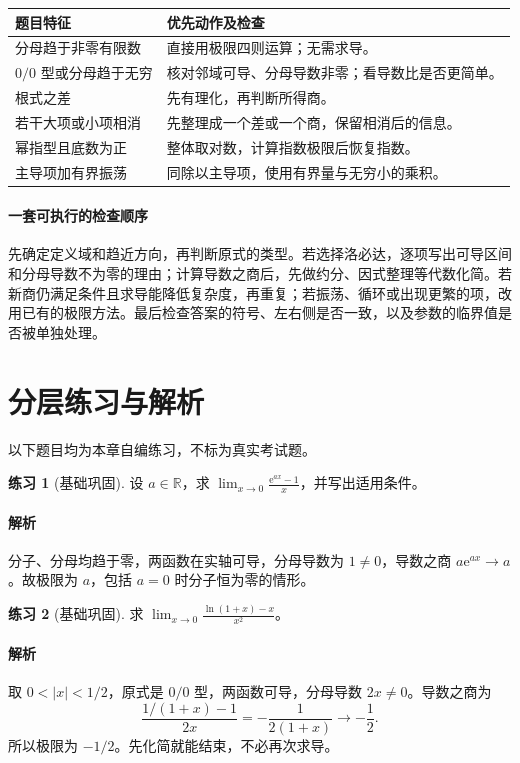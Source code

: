\documentclass[UTF8,fontset=fandol,12pt,oneside,openany]{ctexrep}
\newcommand{\R}{\mathbb R}
\newcommand{\ee}{\mathrm e}
\theoremstyle{definition}
\newtheorem{exercise}{练习}[chapter]
\begin{document}
\begin{center}
\begin{tabular}{p{}p{}}
\toprule
题目特征 & 优先动作及检查 \\
\midrule
分母趋于非零有限数 & 直接用极限四则运算；无需求导。 \\
$0/0$ 型或分母趋于无穷 & 核对邻域可导、分母导数非零；看导数比是否更简单。 \\
根式之差 & 先有理化，再判断所得商。 \\
若干大项或小项相消 & 先整理成一个差或一个商，保留相消后的信息。 \\
幂指型且底数为正 & 整体取对数，计算指数极限后恢复指数。 \\
主导项加有界振荡 & 同除以主导项，使用有界量与无穷小的乘积。 \\
\bottomrule
\end{tabular}
\end{center}

\paragraph{一套可执行的检查顺序}
先确定定义域和趋近方向，再判断原式的类型。若选择洛必达，逐项写出可导区间和分母导数不为零的理由；计算导数之商后，先做约分、因式整理等代数化简。若新商仍满足条件且求导能降低复杂度，再重复；若振荡、循环或出现更繁的项，改用已有的极限方法。最后检查答案的符号、左右侧是否一致，以及参数的临界值是否被单独处理。

\section{分层练习与解析}
\label{lec:07:exercises}

以下题目均为本章自编练习，不标为真实考试题。

\begin{exercise}[基础巩固]
设 $a\in\R$，求 $\displaystyle\lim_{x\to0}\frac{\ee^{ax}-1}{x}$，并写出适用条件。
\end{exercise}
\paragraph{解析}
分子、分母均趋于零，两函数在实轴可导，分母导数为 $1\ne0$，导数之商 $a\ee^{ax}\to a$。故极限为 $a$，包括 $a=0$ 时分子恒为零的情形。

\begin{exercise}[基础巩固]
求 $\displaystyle\lim_{x\to0}\frac{\ln(1+x)-x}{x^2}$。
\end{exercise}
\paragraph{解析}
取 $0<|x|<1/2$，原式是 $0/0$ 型，两函数可导，分母导数 $2x\ne0$。导数之商为
\[
\frac{1/(1+x)-1}{2x}=-\frac1{2(1+x)}\to-\frac12.
\]
所以极限为 $-1/2$。先化简就能结束，不必再次求导。
\end{document}
